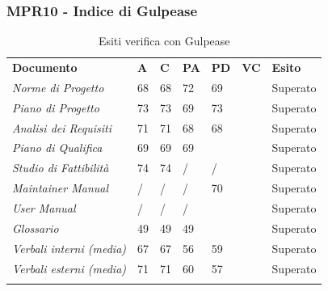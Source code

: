 \subsubsection{MPR10 - Indice di Gulpease}
\begin{center}
    \centering
    \renewcommand{\arraystretch}{1.8}
    \label{tab:IndiciGulpease}
    \begin{longtable}[!h]{p{100px} p{50px} p{50px} p{50px} p{50px} p{50px} p{50px}}
        \caption{Esiti verifica con Gulpease}                                                                                        \\
        \rowcolor{logo!70}   \textbf{Documento} & \textbf{A} & \textbf{C} & \textbf{PA} & \textbf{PD} & \textbf{VC} & \textbf{Esito} \\
        \textit{Norme di Progetto}              & 68         & 68         & 72          & 69          &             & Superato       \\
        \textit{Piano di Progetto}              & 73         & 73         & 69          & 73          &             & Superato       \\
        \textit{Analisi dei Requisiti}          & 71         & 71         & 68          & 68          &             & Superato       \\
        \textit{Piano di Qualifica}             & 69         & 69         & 69          &             &             & Superato       \\
        \textit{Studio di Fattibilità}          & 74         & 74         & /           & /           &             & Superato       \\
        \textit{Maintainer Manual}              & /          & /          & /           & 70          &             & Superato       \\
        \textit{User Manual}                    & /          & /          & /           &             &             & Superato       \\
        \textit{Glossario}                      & 49         & 49         & 49          &             &             & Superato       \\
        \textit{Verbali interni (media)}        & 67         & 67         & 56          & 59          &             & Superato       \\
        \textit{Verbali esterni (media)}        & 71         & 71         & 60          & 57          &             & Superato       \\
        \rowcolor{white}
    \end{longtable}
\end{center}
